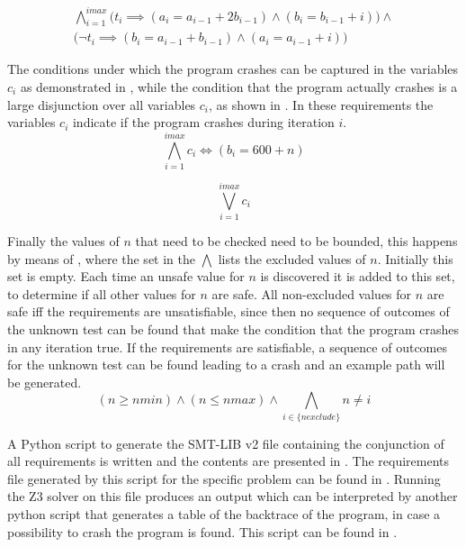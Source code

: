 \begin{equation}
  \label{eqn:4_loop}
  \begin{aligned}
    \bigwedge_{i = 1}^{imax}
      \Big(t_{i} \implies (a_{i} = a_{i - 1} + 2b_{i - 1}) \wedge (b_{i} = b_{i - 1} + i)\Big) \wedge \\
      \Big(\neg t_{i} \implies (b_{i} = a_{i - 1} + b_{i - 1}) \wedge (a_{i} = a_{i - 1} + i)\Big)
    \end{aligned}
\end{equation}

The conditions under which the program crashes can be captured in the variables $c_{i}$ as demonstrated in , while the condition that the program actually crashes is a large disjunction over all variables $c_{i}$, as shown in . In these requirements the variables $c_{i}$ indicate if the program crashes during iteration $i$.
\begin{equation}
  \label{eqn:4_condcrash}
  \bigwedge_{i = 1}^{imax}
    c_{i} \iff (b_{i} = 600 + n)
\end{equation}

\begin{equation}
  \label{eqn:4_docrash}
  \bigvee_{i = 1}^{imax} c_{i}
\end{equation}

Finally the values of $n$ that need to be checked need to be bounded, this happens by means of , where the set in the $\bigwedge$ lists the excluded values of $n$. Initially this set is empty. Each time an unsafe value for $n$ is discovered it is added to this set, to determine if all other values for $n$ are safe. All non-excluded values for $n$ are safe iff the requirements are unsatisfiable, since then no sequence of outcomes of the unknown test can be found that make the condition that the program crashes in any iteration true. If the requirements are satisfiable, a sequence of outcomes for the unknown test can be found leading to a crash and an example path will be generated.
\begin{equation}
  \label{eqn:4_valn}
  (n \geq nmin) \wedge (n \leq nmax) \wedge
  \bigwedge_{i \in \{nexclude\}} n \neq i
\end{equation}

A Python script to generate the SMT-LIB v2 file containing the conjunction of all requirements is written and the contents are presented in . The requirements file generated by this script for the specific problem can be found in . Running the Z3 solver on this file produces an output which can be interpreted by another python script that generates a table of the backtrace of the program, in case a possibility to crash the program is found. This script can be found in .

